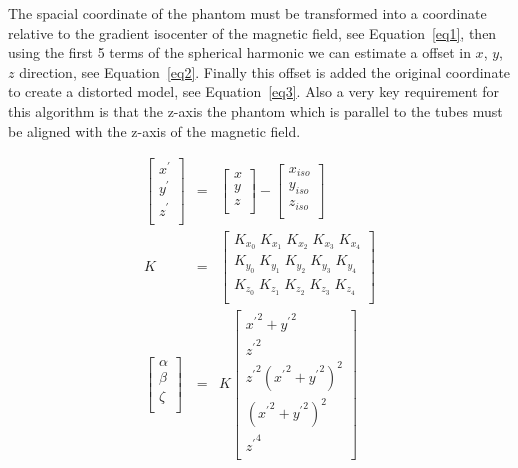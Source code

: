 The spacial coordinate of the phantom must be transformed into a coordinate relative to the gradient isocenter
of the magnetic field, see Equation~\ref{eq1}, then using the first 5 terms of the spherical harmonic we can estimate
a offset in $x$, $y$, $z$ direction, see Equation~\ref{eq2}. Finally this offset is added the original coordinate
to create a distorted model, see Equation~\ref{eq3}.  Also a very key requirement for this algorithm is that the z-axis the phantom which is parallel to the tubes must be aligned with the z-axis of the magnetic field.

\begin{eqnarray}
\begin{bmatrix}
x^\prime  \\
y^\prime  \\
z^\prime  \\
\end{bmatrix}
& = &
\begin{bmatrix}
x \\
y \\
z \\
\end{bmatrix}
-
\begin{bmatrix}
x_{iso} \\
y_{iso} \\
z_{iso}\\
\end{bmatrix}
\label{eq1}
\\
K & = &
\begin{bmatrix}
K_{x_0} \; K_{x_1} \; K_{x_2} \; K_{x_3} \; K_{x_4} \\
K_{y_0} \; K_{y_1} \; K_{y_2} \; K_{y_3} \; K_{y_4} \\
K_{z_0} \; K_{z_1} \; K_{z_2} \; K_{z_3} \; K_{z_4} \\
\end{bmatrix}
\\
\begin{bmatrix}
\alpha \\
\beta \\
\zeta \\
\end{bmatrix}
& = &
K
\begin{bmatrix}
{x^\prime}^2 + {y^\prime}^2 \\
{z^\prime}^2 \\
{z^\prime}^2 {({x^\prime}^2 + {y^\prime}^2)}^2 \\
{({x^\prime}^2 + {y^\prime}^2)}^2 \\
{z^\prime}^4 \\
\end{bmatrix}
\end{eqnarray}
